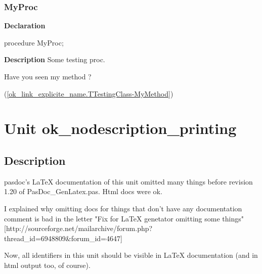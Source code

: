 \documentclass{report}
\begin{document}
\subsection*{MyProc}
\begin{list}{}{
\setlength{\itemindent}{0cm}
\setlength{\listparindent}{0cm}
\setlength{\leftmargin}{\evensidemargin}
\addtolength{\leftmargin}{\tmplength}
\settowidth{\labelsep}{X}
\addtolength{\leftmargin}{\labelsep}
\setlength{\labelwidth}{\tmplength}
}
\begin{flushleft}
\item[\textbf{Declaration}\hfill]
\begin{ttfamily}
procedure MyProc;\end{ttfamily}


\end{flushleft}
\par
\item[\textbf{Description}]
Some testing proc. \begin{ttfamily}Have you seen my method ?\end{ttfamily}(\ref{ok_link_explicite_name.TTestingClass-MyMethod})

\end{list}
\chapter{Unit ok{\_}nodescription{\_}printing}
\section{Description}
pasdoc's LaTeX documentation of this unit omitted many things before revision 1.20 of PasDoc{\_}GenLatex.pas. Html docs were ok.

I explained why omitting docs for things that don't have any documentation comment is bad in the letter "Fix for LaTeX genetator omitting some things" [http://sourceforge.net/mailarchive/forum.php?thread{\_}id=6948809{\&}forum{\_}id=4647]

Now, all identifiers in this unit should be visible in LaTeX documentation (and in html output too, of course).
\end{document}
